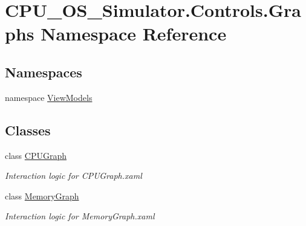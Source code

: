 \hypertarget{namespace_c_p_u___o_s___simulator_1_1_controls_1_1_graphs}{}\section{C\+P\+U\+\_\+\+O\+S\+\_\+\+Simulator.\+Controls.\+Graphs Namespace Reference}
\label{namespace_c_p_u___o_s___simulator_1_1_controls_1_1_graphs}
\subsection*{Namespaces}
\begin{DoxyCompactItemize}
\item 
namespace \hyperlink{namespace_c_p_u___o_s___simulator_1_1_controls_1_1_graphs_1_1_view_models}{View\+Models}
\end{DoxyCompactItemize}
\subsection*{Classes}
\begin{DoxyCompactItemize}
\item 
class \hyperlink{class_c_p_u___o_s___simulator_1_1_controls_1_1_graphs_1_1_c_p_u_graph}{C\+P\+U\+Graph}
\begin{DoxyCompactList}\small\item\em Interaction logic for C\+P\+U\+Graph.\+xaml \end{DoxyCompactList}\item 
class \hyperlink{class_c_p_u___o_s___simulator_1_1_controls_1_1_graphs_1_1_memory_graph}{Memory\+Graph}
\begin{DoxyCompactList}\small\item\em Interaction logic for Memory\+Graph.\+xaml \end{DoxyCompactList}\end{DoxyCompactItemize}
